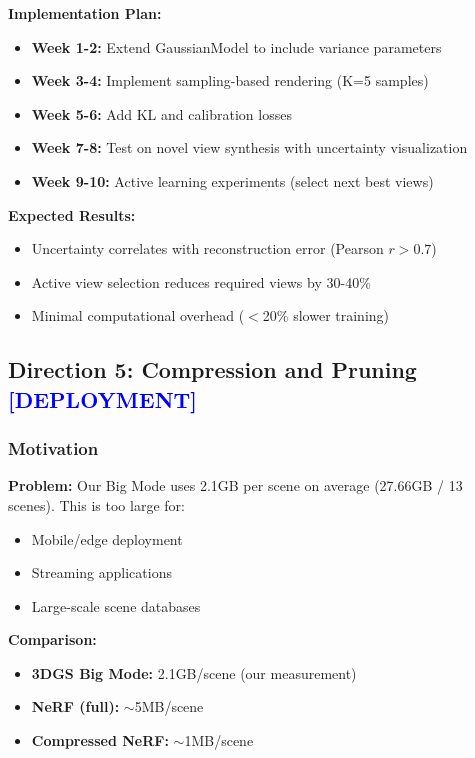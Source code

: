 \documentclass[11pt,letterpaper]{article}
\newcommand{\highlight}[1]{\textcolor{blue}{\textbf{#1}}}
\begin{document}
\textbf{Implementation Plan:}
\begin{itemize}[leftmargin=*]
    \item \textbf{Week 1-2:} Extend GaussianModel to include variance parameters
    \item \textbf{Week 3-4:} Implement sampling-based rendering (K=5 samples)
    \item \textbf{Week 5-6:} Add KL and calibration losses
    \item \textbf{Week 7-8:} Test on novel view synthesis with uncertainty visualization
    \item \textbf{Week 9-10:} Active learning experiments (select next best views)
\end{itemize}

\textbf{Expected Results:}
\begin{itemize}[leftmargin=*]
    \item Uncertainty correlates with reconstruction error (Pearson $r > 0.7$)
    \item Active view selection reduces required views by 30-40\%
    \item Minimal computational overhead ($<$20\% slower training)
\end{itemize}

\subsection{Direction 5: Compression and Pruning \highlight{[DEPLOYMENT]}}

\subsubsection{Motivation}

\textbf{Problem:} Our Big Mode uses 2.1GB per scene on average (27.66GB / 13 scenes). This is too large for:
\begin{itemize}[leftmargin=*]
    \item Mobile/edge deployment
    \item Streaming applications
    \item Large-scale scene databases
\end{itemize}

\textbf{Comparison:}
\begin{itemize}[leftmargin=*]
    \item \textbf{3DGS Big Mode:} 2.1GB/scene (our measurement)
    \item \textbf{NeRF (full):} $\sim$5MB/scene
    \item \textbf{Compressed NeRF:} $\sim$1MB/scene
\end{itemize}
\end{document}

